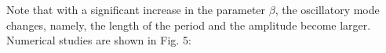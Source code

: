 \documentclass[12pt]{article} %
\begin{document}
\newpage
Note that with a significant increase in the parameter $\beta$, the oscillatory mode changes, namely, the length of the period and the amplitude become larger. Numerical studies are shown in Fig. 5:
\begin{figure}[h!]
\begin{minipage}[h]{0.49\linewidth}
\end{minipage}
\begin{minipage}[h]{0.49\linewidth}
\end{minipage}
\begin{minipage}[h]{0.49\linewidth}

\end{minipage}
\end{figure}
\end{document}
